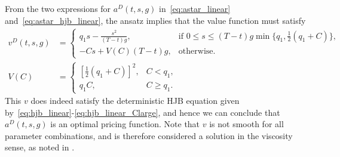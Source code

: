 \documentclass[main.tex]{subfiles}
\begin{document}
From the two expressions for $a^D(t,s,g)$ in~\eqref{eq:astar_linear}
and~\eqref{eq:astar_hjb_linear}, the ansatz implies that the value
function must satisfy
\begin{align}\label{eq:v_func_linear_det}
  v^D(t,s,g)
  &=\begin{cases}
    q_1s-\frac{s^2}{(T-t)g},
    &\text{if } 0\leq s\leq
    (T-t)g\min\{q_1,\frac{1}{2}(q_1 +C)\},\\
    -Cs + V(C)(T-t)g,
    &\text{otherwise.}
  \end{cases}\\
  V(C)
  &= \begin{cases}
    {\left[\frac{1}{2}(q_1+C)  \right]}^2,&C<
    q_1,\\
    q_1C,&C\geq q_1.
  \end{cases}
\end{align}
This $v$ does indeed satisfy the deterministic HJB equation given
by~\eqref{eq:hjb_linear}-\eqref{eq:hjb_linear_Clarge}, and hence we
can conclude that $a^D(t,s,g)$ is an optimal pricing function. Note that $v$ is
not smooth for all parameter combinations, and is therefore considered
a solution in the viscosity sense, as noted in .
\end{document}
